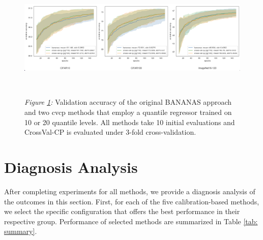 \documentclass[a4paper,oneside,bibliography=totoc]{scrbook}
\begin{document}
\begin{description}[leftmargin=0cm, listparindent=\parindent]
 	\vspace{0.7em}
	\begin{figure}[H]
		\centering
		\includegraphics[scale=0.295 ]{figs/cvcp_quantile_20.png}
		\label{fig: cvcp_quantile_20}
		\\
 		\parbox{\linewidth}{
 		\vspace{0.2em}
  		{\small \textit{Figure \ref{fig: cvcp_quantile_20}:} Validation accuracy of the original BANANAS approach and two \gls{cvcp} methods that employ a quantile regressor trained on 10 or 20 quantile levels. All methods take 10 initial evaluations and CrossVal-CP is evaluated under 3-fold cross-validation. 
  		}
 	 }	
	\end{figure}	 	
	   	 	
\end{description}
\section{Diagnosis Analysis}
After completing experiments for all methods, we provide a diagnosis analysis of the outcomes in this section. First, for each of the five calibration-based methods, we select the specific configuration that offers the best performance in their respective group. Performance of selected methods are summarized in Table \ref{tab: summary}.
\end{document}
